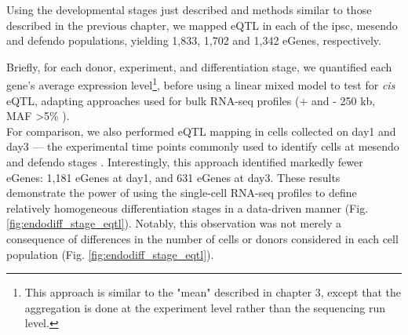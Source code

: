 Using the developmental stages just described and methods similar to those described in the previous chapter, we mapped eQTL in each of the \gls{ipsc}, mesendo and defendo populations, yielding 1,833, 1,702 and 1,342 eGenes, respectively. 

Briefly, for each donor, experiment, and differentiation stage, we quantified each gene’s average expression level\footnote{This approach is similar to the "mean" described in chapter 3, except that the aggregation is done at the experiment level rather than the sequencing run level.}, before using a linear mixed model to test for \textit{cis} eQTL, adapting approaches used for bulk RNA-seq profiles (+ and - 250 kb, MAF >5\% \cite{kilpinen2017common}).\\

For comparison, we also performed eQTL mapping in cells collected on day1 and day3 — the experimental time points commonly used to identify cells at mesendo and defendo stages \cite{hannan2013production}.
Interestingly, this approach identified markedly fewer eGenes: 1,181 eGenes at day1, and 631 eGenes at day3.
These results demonstrate the power of using the single-cell RNA-seq profiles to define relatively homogeneous differentiation stages in a data-driven manner (Fig. \ref{fig:endodiff_stage_eqtl}). 
Notably, this observation was not merely a consequence of differences in the number of cells or donors considered in each cell population (Fig. \ref{fig:endodiff_stage_eqtl}).


